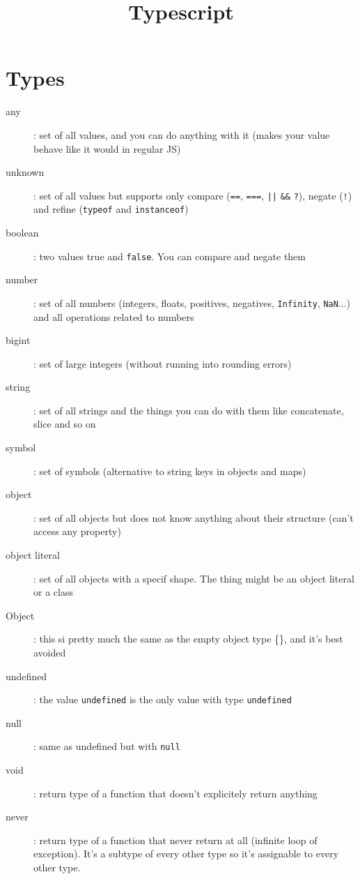 \documentclass[french]{article}
\title{Typescript}
\begin{document}
\date{}

\maketitle

\section{Types}

\begin{description}
  \item[any]: set of all values, and you can do anything with it (makes your value behave like it would in regular JS)
  \item[unknown]: set of all values but supports only compare (\lstinline{==}, \lstinline{===}, \lstinline{||} \lstinline{&&} \lstinline{?}), negate (\lstinline{!}) and refine (\lstinline{typeof} and \lstinline{instanceof})
  \item[boolean]: two values true and \lstinline{false}. You can compare and negate them
  \item[number]: set of all numbers (integers, floats, positives, negatives, \lstinline{Infinity}, \lstinline{NaN}...) and all operations related to numbers
  \item[bigint]: set of large integers (without running into rounding errors)
  \item[string]: set of all strings and the things you can do with them like concatenate, slice and so on
  \item[symbol]: set of symbols (alternative to string keys in objects and maps)
  \item[object]: set of all objects but does not know anything about their structure (can't access any property)
  \item[object literal]: set of all objects with a specif shape. The thing might be an object literal or a class
  \item[Object]: this si pretty much the same as the empty object type \{\}, and it's best avoided
  \item[undefined]: the value \lstinline{undefined} is the only value with type \lstinline{undefined}
  \item[null]: same as undefined but with \lstinline{null}
  \item[void]: return type of a function that doesn't explicitely return anything
  \item[never]: return type of a function that never return at all (infinite loop of exception). It's a subtype of every other type so it's assignable to every other type.
\end{description}
\end{document}
